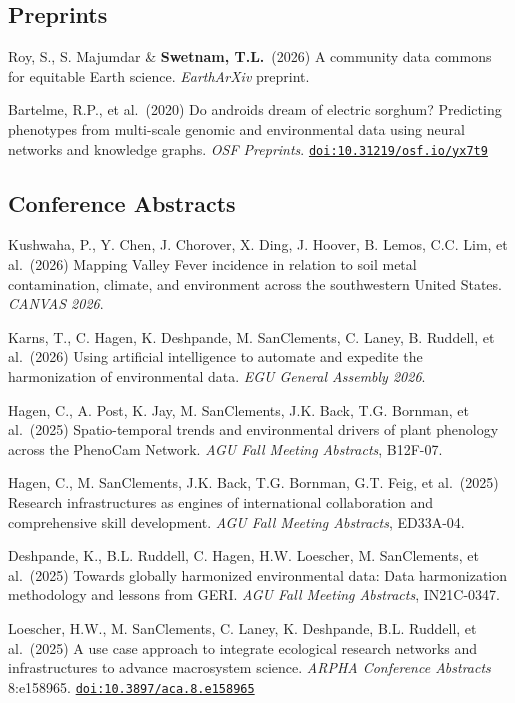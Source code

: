 \documentclass[11pt,letterpaper]{article}
\newcommand{\me}{\textbf{Swetnam, T.L.}}
\newcommand{\doi}[1]{\href{https://doi.org/#1}{\nolinkurl{doi:#1}}}
\newenvironment{hanglist}
  {\begin{list}{}{\setlength{\leftmargin}{1.4em}\setlength{\itemindent}{-1.4em}%
     \setlength{\itemsep}{3pt}\setlength{\parsep}{0pt}\setlength{\topsep}{1pt}}}
  {\end{list}}
\begin{document}
\subsection{Preprints}
\begin{hanglist}
\item Roy, S., S. Majumdar \& \me\ (2026) A community data commons for equitable Earth science. \textit{EarthArXiv} preprint.
\item Bartelme, R.P., et al.\ (2020) Do androids dream of electric sorghum? Predicting phenotypes from multi-scale genomic and environmental data using neural networks and knowledge graphs. \textit{OSF Preprints}. \doi{10.31219/osf.io/yx7t9}
\end{hanglist}

\subsection{Conference Abstracts}
\begin{hanglist}
\item Kushwaha, P., Y. Chen, J. Chorover, X. Ding, J. Hoover, B. Lemos, C.C. Lim, et al.\ (2026) Mapping Valley Fever incidence in relation to soil metal contamination, climate, and environment across the southwestern United States. \textit{CANVAS 2026}.
\item Karns, T., C. Hagen, K. Deshpande, M. SanClements, C. Laney, B. Ruddell, et al.\ (2026) Using artificial intelligence to automate and expedite the harmonization of environmental data. \textit{EGU General Assembly 2026}.
\item Hagen, C., A. Post, K. Jay, M. SanClements, J.K. Back, T.G. Bornman, et al.\ (2025) Spatio-temporal trends and environmental drivers of plant phenology across the PhenoCam Network. \textit{AGU Fall Meeting Abstracts}, B12F-07.
\item Hagen, C., M. SanClements, J.K. Back, T.G. Bornman, G.T. Feig, et al.\ (2025) Research infrastructures as engines of international collaboration and comprehensive skill development. \textit{AGU Fall Meeting Abstracts}, ED33A-04.
\item Deshpande, K., B.L. Ruddell, C. Hagen, H.W. Loescher, M. SanClements, et al.\ (2025) Towards globally harmonized environmental data: Data harmonization methodology and lessons from GERI. \textit{AGU Fall Meeting Abstracts}, IN21C-0347.
\item Loescher, H.W., M. SanClements, C. Laney, K. Deshpande, B.L. Ruddell, et al.\ (2025) A use case approach to integrate ecological research networks and infrastructures to advance macrosystem science. \textit{ARPHA Conference Abstracts} 8:e158965. \doi{10.3897/aca.8.e158965}
\end{hanglist}
\end{document}
